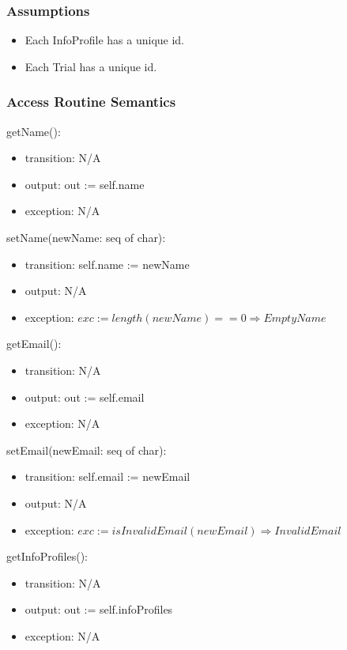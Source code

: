 \documentclass[12pt, titlepage]{article}
\begin{document}
\subsubsection{Assumptions}
\begin{itemize}
  \item Each InfoProfile has a unique id.
  \item Each Trial has a unique id.
\end{itemize}

\subsubsection{Access Routine Semantics}

\noindent getName():
\begin{itemize}
\item transition: N/A
\item output: out := self.name
\item exception: N/A
\end{itemize}

\noindent setName(newName: seq of char):
\begin{itemize}
\item transition: self.name := newName
\item output: N/A
\item exception: $exc := length(newName) == 0 \Rightarrow EmptyName$
\end{itemize}

\noindent getEmail():
\begin{itemize}
\item transition: N/A
\item output: out := self.email
\item exception: N/A
\end{itemize}

\noindent setEmail(newEmail: seq of char):
\begin{itemize}
\item transition: self.email := newEmail
\item output: N/A
\item exception: $exc := isInvalidEmail(newEmail) \Rightarrow InvalidEmail$
\end{itemize}

\noindent getInfoProfiles():
\begin{itemize}
\item transition: N/A
\item output: out := self.infoProfiles
\item exception: N/A
\end{itemize}
\end{document}
